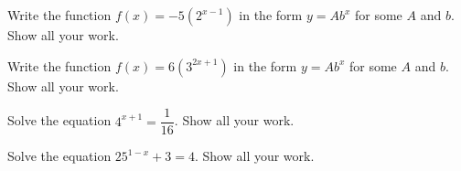\documentclass[11pt,letterpaper]{article}
\begin{document}

 Write the function $f(x)= -5(2^{x-1})$ in the form $y= Ab^x$ for some $A$ and $b$. Show all your work.



\newpage


 Write the function $f(x)= 6(3^{2x+1})$ in the form $y= Ab^x$ for some $A$ and $b$. Show all your work.




\newpage


 Solve the equation $4^{x+1}= \dfrac{1}{16}$. Show all your work.



\newpage


 Solve the equation $25^{1-x} + 3= 4$. Show all your work. 



\newpage





\end{document}

